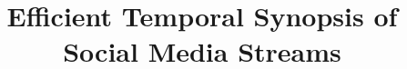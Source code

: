 \documentclass{sig-alternate}
\begin{document}
%
\title{Efficient Temporal Synopsis of Social Media Streams}
%
%
%
%
%
\maketitle
\end{document}
